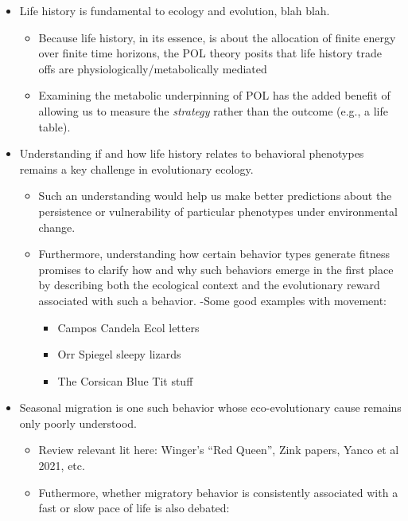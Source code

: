 \documentclass[
]{article}
\providecommand{\tightlist}{%
  \setlength{\itemsep}{0pt}\setlength{\parskip}{0pt}}
\begin{document}
\begin{itemize}
\tightlist
\item
  Life history is fundamental to ecology and evolution, blah blah.

  \begin{itemize}
  \tightlist
  \item
    Because life history, in its essence, is about the allocation of
    finite energy over finite time horizons, the POL theory posits that
    life history trade offs are physiologically/metabolically mediated
  \item
    Examining the metabolic underpinning of POL has the added benefit of
    allowing us to measure the \emph{strategy} rather than the outcome
    (e.g., a life table).
  \end{itemize}
\item
  Understanding if and how life history relates to behavioral phenotypes
  remains a key challenge in evolutionary ecology.

  \begin{itemize}
  \tightlist
  \item
    Such an understanding would help us make better predictions about
    the persistence or vulnerability of particular phenotypes under
    environmental change.
  \item
    Furthermore, understanding how certain behavior types generate
    fitness promises to clarify how and why such behaviors emerge in the
    first place by describing both the ecological context and the
    evolutionary reward associated with such a behavior. -Some good
    examples with movement:

    \begin{itemize}
    \tightlist
    \item
      Campos Candela Ecol letters
    \item
      Orr Spiegel sleepy lizards
    \item
      The Corsican Blue Tit stuff
    \end{itemize}
  \end{itemize}
\item
  Seasonal migration is one such behavior whose eco-evolutionary cause
  remains only poorly understood.

  \begin{itemize}
  \tightlist
  \item
    Review relevant lit here: Winger's ``Red Queen'', Zink papers, Yanco
    et al 2021, etc.
  \item
    Futhermore, whether migratory behavior is consistently associated
    with a fast or slow pace of life is also debated:


\end{itemize}
\end{itemize}
\end{document}
